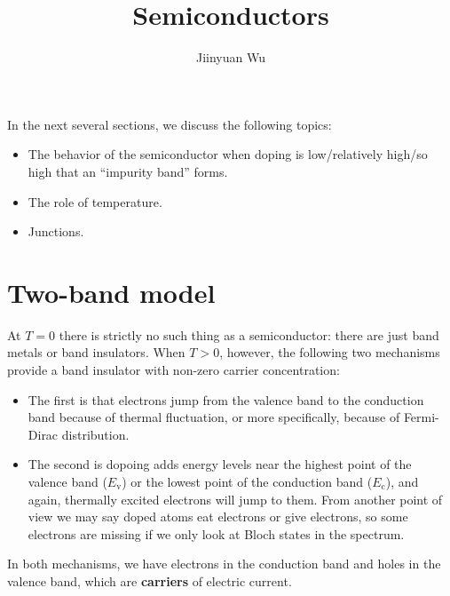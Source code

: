 \documentclass[hyperref, a4paper]{article}
\title{Semiconductors}
\author{Jiinyuan Wu}
\newcommand*{\concept}[1]{{\textbf{#1}}}
\begin{document}
\maketitle

In the next several sections, we discuss the following topics: 
\begin{itemize}
    \item The behavior of the semiconductor when doping is 
    low/relatively high/so high that an ``impurity band'' forms.
    \item The role of temperature.
    \item Junctions.
\end{itemize}

\section{Two-band model}

At $T = 0$ there is strictly no such thing as a semiconductor:
there are just band metals or band insulators.
When $T > 0$, however, 
the following two mechanisms provide a band insulator 
with non-zero carrier concentration:
\begin{itemize}
    \item The first is that electrons jump from the valence band to the conduction band
    because of thermal fluctuation, or more specifically, 
    because of Fermi-Dirac distribution.
    \item The second is dopoing adds energy levels 
    near the highest point of the valence band ($E_{\text{v}}$)
    or the lowest point of the conduction band ($E_{\text{c}}$),
    and again, thermally excited electrons will jump to them.
    From another point of view we may say doped atoms eat electrons or give electrons,
    so some electrons are missing if we only look at Bloch states in the spectrum.
\end{itemize}
In both mechanisms,
we have electrons in the conduction band and holes in the valence band,
which are \concept{carriers} of electric current.
\end{document}
